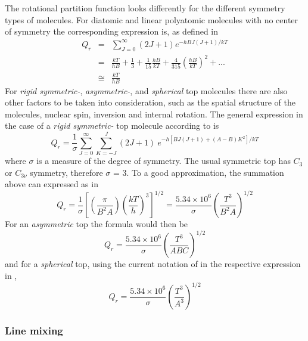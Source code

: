 The rotational partition function looks differently for the different
symmetry types of molecules.
For diatomic and linear  polyatomic molecules with no center of
symmetry the corresponding expression is, as defined in \citet{gordyandcook:70}
\begin{eqnarray}\label{eq:abs_theory:rot_partition}
Q_r & = & \sum_{J=0}^\infty (2J+1)e^{-hBJ(J+1)/kT}\nonumber\\
   & = & \frac{kT}{hB}+\frac{1}{3}+\frac{1}{15}\frac{hB}{kT}+\frac{4}{315}\left(\frac{hB}{kT}\right)^2+...\nonumber\\
   & \cong & \frac{kT}{hB}
\end{eqnarray}
For {\it{ rigid symmetric-}}, {\it{asymmetric-}}, and {\it{spherical}} top molecules there are also
other factors to be taken into consideration, such as the
spatial structure of the molecules, nuclear spin, inversion and
internal rotation. The general expression in the case of a 
{\it{ rigid symmetric-}} top molecule according to \citet{herzberg:45}
is
\begin{equation}\label{eq:abs_theory:rot_partition_symtop}
Q_r  =  \frac{1}{\sigma}\sum_{J=0}^\infty \sum_{K=-J}^{J}(2J+1)~e^{-h[BJ(J+1)+(A-B)K^2]/kT}
\end{equation}
where $\sigma$ is a measure of the degree of symmetry. The usual
symmetric top has $C_3$ or $C_{3\nu}$ symmetry, therefore $\sigma$ = 3. To a good
approximation, the summation above can expressed as in \citet{gordyandcook:70}
\begin{equation}\label{eq:abs_theory:rot_partition_top_appro}
Q_r  = 
\frac{1}{\sigma}\left[\left(\frac{\pi}{B^2A}\right)\left(\frac{kT}{h}\right)^3\right]^{1/2}=
\frac{5.34\times 10^6}{\sigma}\left(\frac{T^3}{B^{2}A}\right)^{1/2}
\end{equation}
For an  {\it{asymmetric}} top the formula would then be 
\begin{equation}\label{eq:abs_theory:rot_partition_asymtop}
Q_r = \frac{5.34\times 10^6}{\sigma}\left(\frac{T^3}{ABC}\right)^{1/2}
\end{equation}
and for a {\it{spherical}} top, using the current notation of
\citet{gordyandcook:70} in the respective expression in \citet{herzberg:45},
\begin{equation}\label{eq:abs_theory:rot_partition_sphetop}
Q_r = \frac{5.34\times 10^6}{\sigma}\left(\frac{T^3}{A^3}\right)^{1/2}
\end{equation}

\subsubsection{Line mixing}

